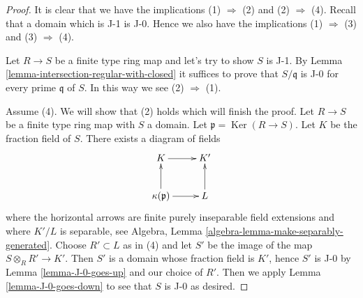 \documentclass[10pt,a4paper]{amsart}
\theoremstyle{plain}
\theoremstyle{definition}
\theoremstyle{remark}
\numberwithin{equation}{subsection}
\def\Ker{\mathop{\mathrm{Ker}}}
\begin{document}
\begin{proof}
It is clear that we have the implications (1) $\Rightarrow$ (2) and
(2) $\Rightarrow$ (4). Recall that a domain which is
J-1 is J-0. Hence we also have the implications
(1) $\Rightarrow$ (3) and (3) $\Rightarrow$ (4).

\medskip\noindent
Let $R \to S$ be a finite type ring map and let's try to show $S$ is J-1. By
Lemma \ref{lemma-intersection-regular-with-closed} it suffices
to prove that $S/\mathfrak q$ is J-0 for every prime $\mathfrak q$
of $S$. In this way we see (2) $\Rightarrow$ (1).

\medskip\noindent
Assume (4). We will show that (2) holds which will finish the proof.
Let $R \to S$ be a finite type ring map with $S$ a domain.
Let $\mathfrak p = \Ker(R \to S)$. Let $K$ be the fraction field of $S$.
There exists a diagram of fields
$$
\xymatrix{
K \ar[r] & K' \\
\kappa(\mathfrak p) \ar[u] \ar[r] & L \ar[u]
}
$$
where the horizontal arrows are finite purely inseparable field extensions
and where $K'/L$ is separable, see
Algebra, Lemma \ref{algebra-lemma-make-separably-generated}.
Choose $R' \subset L$ as in (4) and let
$S'$ be the image of the map $S \otimes_R R' \to K'$.
Then $S'$ is a domain whose fraction field is $K'$, hence
$S'$ is J-0 by Lemma \ref{lemma-J-0-goes-up} and our choice of $R'$.
Then we apply Lemma \ref{lemma-J-0-goes-down} to see that $S$
is J-0 as desired.
\end{proof}
\end{document}
